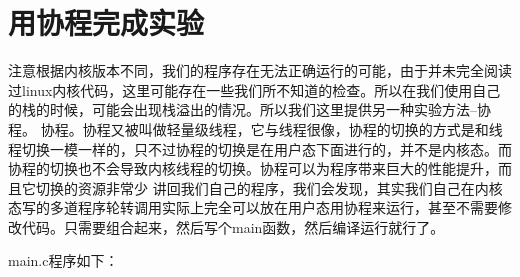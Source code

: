 \documentclass[lang=cn,10pt]{elegantbook}
\begin{document}
\section{用协程完成实验}
注意根据内核版本不同，我们的程序存在无法正确运行的可能，由于并未完全阅读过linux内核代码，这里可能存在一些我们所不知道的检查。所以在我们使用自己的栈的时候，可能会出现栈溢出的情况。所以我们这里提供另一种实验方法--协程。
协程。协程又被叫做轻量级线程，它与线程很像，协程的切换的方式是和线程切换一模一样的，只不过协程的切换是在用户态下面进行的，并不是内核态。而协程的切换也不会导致内核线程的切换。协程可以为程序带来巨大的性能提升，而且它切换的资源非常少
讲回我们自己的程序，我们会发现，其实我们自己在内核态写的多道程序轮转调用实际上完全可以放在用户态用协程来运行，甚至不需要修改代码。只需要组合起来，然后写个main函数，然后编译运行就行了。

main.c程序如下：
\end{document}
